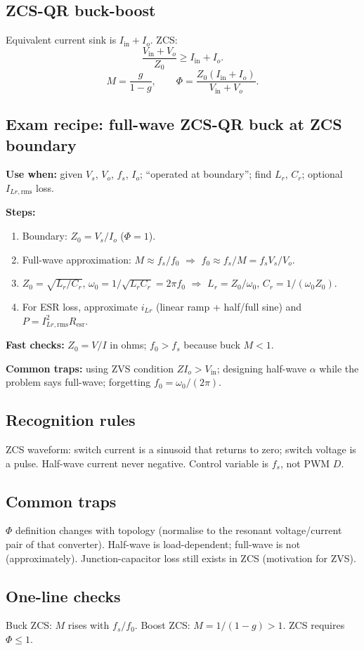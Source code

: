 \subsection{ZCS-QR buck-boost}
Equivalent current sink is \(I_{\mathrm{in}}+I_o\). ZCS:
\[
\frac{V_{\mathrm{in}}+V_o}{Z_0}\ge I_{\mathrm{in}}+I_o.
\]
\[
M=\frac{g}{1-g},\qquad \Phi=\frac{Z_0(I_{\mathrm{in}}+I_o)}{V_{\mathrm{in}}+V_o}.
\]

\subsection{Exam recipe: full-wave ZCS-QR buck at ZCS boundary}
\textbf{Use when:} given \(V_s\), \(V_o\), \(f_s\), \(I_o\); ``operated at boundary''; find \(L_r\), \(C_r\); optional \(I_{Lr,\mathrm{rms}}\) loss.

\textbf{Steps:}
\begin{enumerate}
  \item Boundary: \(Z_0=V_s/I_o\) (\(\Phi=1\)).
  \item Full-wave approximation: \(M\approx f_s/f_0\) \(\Rightarrow\) \(f_0\approx f_s/M=f_s V_s/V_o\).
  \item \(Z_0=\sqrt{L_r/C_r}\), \(\omega_0=1/\sqrt{L_r C_r}=2\pi f_0\) \(\Rightarrow\) \(L_r=Z_0/\omega_0\), \(C_r=1/(\omega_0 Z_0)\).
  \item For ESR loss, approximate \(i_{Lr}\) (linear ramp + half/full sine) and \(P=I_{Lr,\mathrm{rms}}^2 R_{\mathrm{esr}}\).
\end{enumerate}

\textbf{Fast checks:} \(Z_0=V/I\) in ohms; \(f_0>f_s\) because buck \(M<1\).

\textbf{Common traps:} using ZVS condition \(Z I_o>V_{\mathrm{in}}\); designing half-wave \(\alpha\) while the problem says full-wave; forgetting \(f_0=\omega_0/(2\pi)\).

\subsection{Recognition rules}
ZCS waveform: switch current is a sinusoid that returns to zero; switch voltage is a pulse. Half-wave current never negative. Control variable is \(f_s\), not PWM \(D\).

\subsection{Common traps}
\(\Phi\) definition changes with topology (normalise to the resonant voltage/current pair of that converter). Half-wave is load-dependent; full-wave is not (approximately). Junction-capacitor loss still exists in ZCS (motivation for ZVS).

\subsection{One-line checks}
Buck ZCS: \(M\) rises with \(f_s/f_0\). Boost ZCS: \(M=1/(1-g)>1\). ZCS requires \(\Phi\le 1\).
